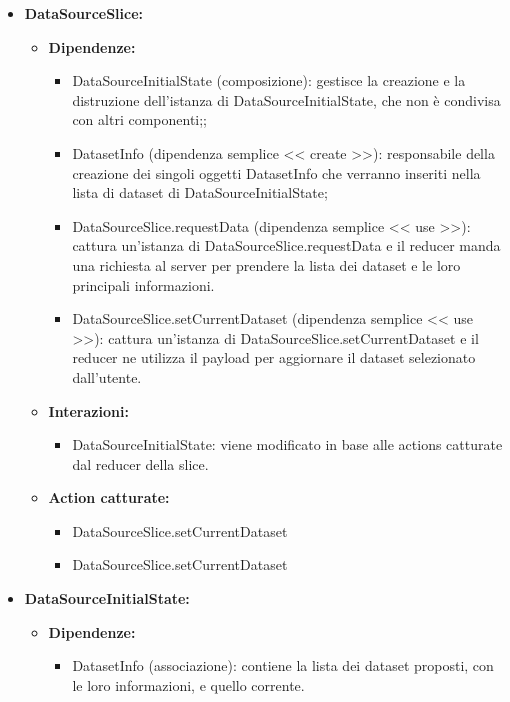\begin{itemize}
    \item \textbf{DataSourceSlice:}
    \begin{itemize}
        \item \textbf{Dipendenze:}
        \begin{itemize}
            \item DataSourceInitialState (composizione): gestisce la creazione e la distruzione dell'istanza di DataSourceInitialState, che non è condivisa con altri componenti;;
            \item DatasetInfo (dipendenza semplice << create >>):  responsabile della creazione dei singoli oggetti DatasetInfo che verranno inseriti nella lista di dataset di DataSourceInitialState;
            \item DataSourceSlice.requestData (dipendenza semplice << use >>): cattura un'istanza di DataSourceSlice.requestData e il reducer manda una richiesta al server per prendere la lista dei dataset e le loro principali informazioni.
            \item DataSourceSlice.setCurrentDataset (dipendenza semplice << use >>): cattura un'istanza di DataSourceSlice.setCurrentDataset e il reducer ne utilizza il payload per aggiornare il dataset selezionato dall'utente.
        \end{itemize} 
        \item \textbf{Interazioni:}
        \begin{itemize}
            \item DataSourceInitialState: viene modificato in base alle actions catturate dal reducer della slice.
        \end{itemize} 
        \item \textbf{Action catturate:}
        \begin{itemize}
            \item DataSourceSlice.setCurrentDataset
            \item DataSourceSlice.setCurrentDataset
        \end{itemize} 
    \end{itemize}

    
    \item \textbf{DataSourceInitialState:}
    \begin{itemize}
        \item \textbf{Dipendenze:}
        \begin{itemize}
            \item DatasetInfo (associazione): contiene la lista dei dataset proposti, con le loro informazioni, e quello corrente.
        \end{itemize} 
    \end{itemize}


\end{itemize}
